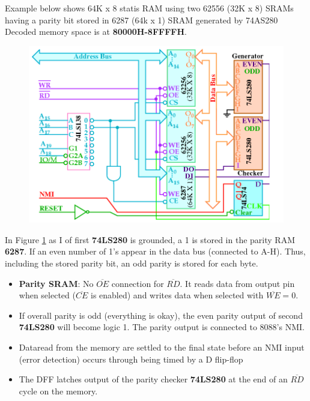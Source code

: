 \newpage
Example below shows 64K x 8 statis RAM using two 62556 (32K x 8) SRAMs having a parity bit stored in 6287 (64k x 1) SRAM generated by 74AS280
\newline
Decoded memory space is at \textbf{80000H-8FFFFH}.
\begin{figure}[h!]
  \includegraphics[width = 1\textwidth]{./figures/Parity.png}
  \label{fig:parity}
\end{figure}
In Figure \ref{fig:parity} as I of first \textbf{74LS280} is grounded, a 1 is stored in the parity RAM \textbf{6287}. If an even number of 1's appear in the data bus (connected to A-H). Thus, including the stored parity bit, an odd parity is stored for each byte.
\newline
\begin{itemize}
  \item \textbf{Parity SRAM}: No $\overline{OE}$ connection for $\overline{RD}$. It reads data from output pin when selected ($\overline{CE}$ is enabled) and writes data when selected with $\overline{WE} = 0$.
  \item If overall parity is odd (everything is okay), the even parity output of second \textbf{74LS280} will become logic 1. The parity output is connected to 8088's NMI.
  \item Dataread from the memory are settled to the final state before an NMI input (error detection) occurs through being timed by a D flip-flop
  \item The DFF latches output of the parity checker \textbf{74LS280} at the end of an $\overline{RD}$ cycle on the memory.
\end{itemize}

